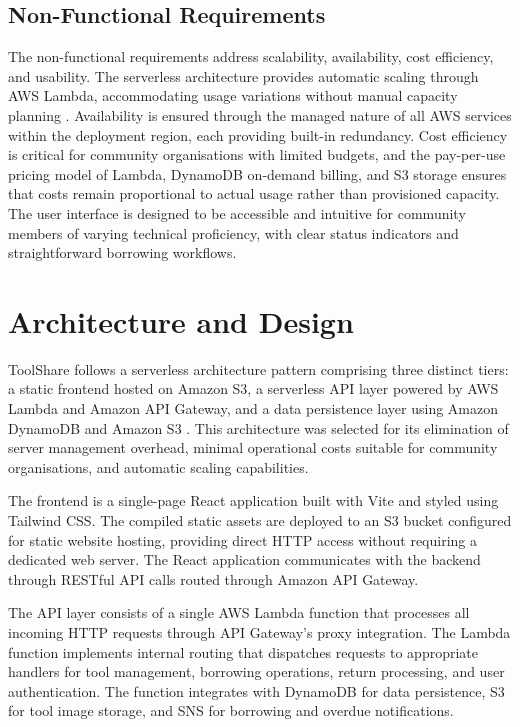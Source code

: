 \documentclass[conference]{IEEEtran}
\begin{document}
\subsection{Non-Functional Requirements}

The non-functional requirements address scalability, availability, cost efficiency, and usability. The serverless architecture provides automatic scaling through AWS Lambda, accommodating usage variations without manual capacity planning \cite{awslambda}. Availability is ensured through the managed nature of all AWS services within the deployment region, each providing built-in redundancy. Cost efficiency is critical for community organisations with limited budgets, and the pay-per-use pricing model of Lambda, DynamoDB on-demand billing, and S3 storage ensures that costs remain proportional to actual usage rather than provisioned capacity. The user interface is designed to be accessible and intuitive for community members of varying technical proficiency, with clear status indicators and straightforward borrowing workflows.

\section{Architecture and Design}

ToolShare follows a serverless architecture pattern comprising three distinct tiers: a static frontend hosted on Amazon S3, a serverless API layer powered by AWS Lambda and Amazon API Gateway, and a data persistence layer using Amazon DynamoDB and Amazon S3 \cite{cloudpatterns}. This architecture was selected for its elimination of server management overhead, minimal operational costs suitable for community organisations, and automatic scaling capabilities.

The frontend is a single-page React application built with Vite and styled using Tailwind CSS. The compiled static assets are deployed to an S3 bucket configured for static website hosting, providing direct HTTP access without requiring a dedicated web server. The React application communicates with the backend through RESTful API calls routed through Amazon API Gateway.

The API layer consists of a single AWS Lambda function that processes all incoming HTTP requests through API Gateway's proxy integration. The Lambda function implements internal routing that dispatches requests to appropriate handlers for tool management, borrowing operations, return processing, and user authentication. The function integrates with DynamoDB for data persistence, S3 for tool image storage, and SNS for borrowing and overdue notifications.
\end{document}

